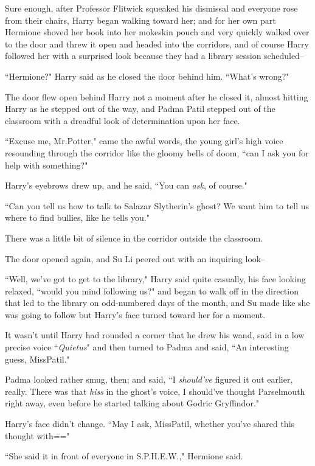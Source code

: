 Sure enough, after Professor Flitwick squeaked his dismissal and everyone rose from their chairs, Harry began walking toward her; and for her own part Hermione shoved her book into her mokeskin pouch and very quickly walked over to the door and threw it open and headed into the corridors, and of course Harry followed her with a surprised look because they had a library session scheduled\---

``Hermione?" Harry said as he closed the door behind him. ``What's wrong?"

The door flew open behind Harry not a moment after he closed it, almost hitting Harry as he stepped out of the way, and Padma Patil stepped out of the classroom with a dreadful look of determination upon her face.

``Excuse me, Mr.\?Potter," came the awful words, the young girl's high voice resounding through the corridor like the gloomy bells of doom, ``can I ask you for help with something?"

Harry's eyebrows drew up, and he said, ``You can \emph{ask}, of course."

``Can you tell us how to talk to Salazar Slytherin's ghost? We want him to tell us where to find bullies, like he tells you."

There was a little bit of silence in the corridor outside the classroom.

The door opened again, and Su Li peered out with an inquiring look\---

``Well, we've got to get to the library," Harry said quite casually, his face looking relaxed, ``would you mind following us?" and began to walk off in the direction that led to the library on odd-numbered days of the month, and Su made like she was going to follow but Harry's face turned toward her for a moment.

It wasn't until Harry had rounded a corner that he drew his wand, said in a low precise voice ``\emph{Quietus}" and then turned to Padma and said, ``An interesting guess, Miss\?Patil."

Padma looked rather smug, then; and said, ``I \emph{should've} figured it out earlier, really. There was that \emph{hiss} in the ghost's voice, I should've thought Parselmouth right away, even before he started talking about Godric Gryffindor."

Harry's face didn't change. ``May I ask, Miss\?Patil, whether you've shared this thought with\==="

``She said it in front of everyone in S.P.H.E.W.," Hermione said.

